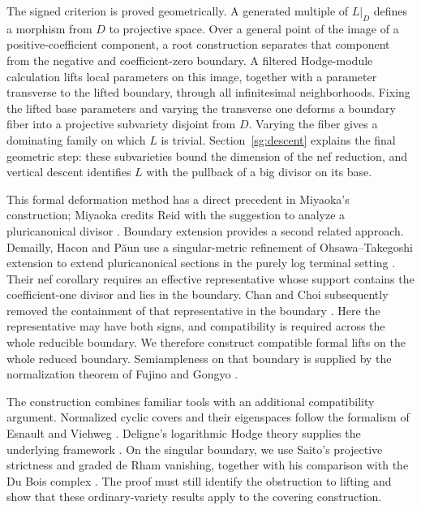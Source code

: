 The signed criterion is proved geometrically. A generated multiple of
$L|_D$ defines a morphism from $D$ to projective space. Over a general point
of the image of a positive-coefficient component, a root construction
separates that component from the negative and coefficient-zero boundary.
A filtered Hodge-module calculation lifts local parameters on this image,
together with a parameter transverse to the lifted boundary, through all
infinitesimal neighborhoods. Fixing the lifted base parameters and varying
the transverse one deforms a boundary fiber into a projective subvariety
disjoint from $D$. Varying the fiber gives a dominating family on which $L$
is trivial. Section~\ref{sg:descent} explains the final geometric step:
these subvarieties bound the dimension of the nef reduction, and vertical
descent identifies $L$ with the pullback of a big divisor on its base.

This formal
deformation method has a direct precedent in Miyaoka's construction;
Miyaoka credits Reid with the suggestion to analyze a pluricanonical
divisor \cite[p.~220]{Miyaoka1988}. Boundary extension provides a second
related approach. Demailly, Hacon and P\u{a}un use a singular-metric
refinement of Ohsawa--Takegoshi extension to extend pluricanonical sections
in the purely log terminal setting
\cite[Theorem~1.7 and Corollary~1.8]{DemaillyHaconPaun2013}.
Their nef corollary requires an effective representative whose support
contains the coefficient-one divisor and lies in the boundary. Chan and Choi subsequently removed the containment of that representative
in the boundary \cite[Theorem~1.6.1]{ChanChoi2021}.
Here the representative may have both signs, and compatibility is required
across the whole reducible boundary.
We therefore construct compatible formal lifts on the whole reduced
boundary. Semiampleness on that boundary is supplied by the normalization
theorem of Fujino and Gongyo
\cite[Theorem~1.5]{FujinoGongyo2014}.

The construction combines familiar tools with an additional compatibility
argument. Normalized cyclic covers and their eigenspaces follow the
formalism of Esnault and Viehweg \cite[Section~3]{EsnaultViehweg1992}.
Deligne's logarithmic Hodge theory supplies the underlying framework
\cite{Deligne1971}. On the singular boundary, we use Saito's projective
strictness and graded de Rham vanishing, together with his comparison
with the Du Bois complex
\cite[Theorem~2.14 and Proposition~2.33]{Saito1990}
\cite[Theorem~0.2 and Corollary~0.3]{Saito2000}.
The proof must still identify the obstruction to lifting and show that
these ordinary-variety results apply to the covering construction.

